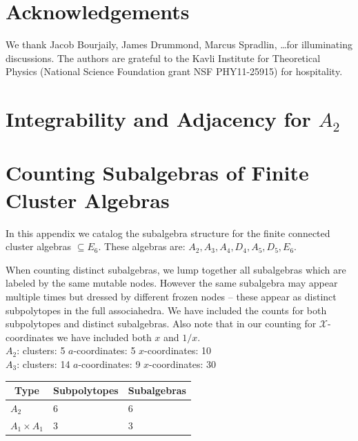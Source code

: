 \documentclass[11pt]{article}
\def\xcoords{$\mathcal{X}$-coordinates }
\def\pdfeq#1{\texorpdfstring{$#1$}{a}}
\begin{document}
\section*{Acknowledgements}

We thank Jacob Bourjaily, James Drummond, Marcus Spradlin, \dots for illuminating discussions. The authors are grateful to the Kavli Institute for Theoretical Physics (National Science Foundation grant NSF PHY11-25915) for hospitality. 


\appendix

\section{Integrability and Adjacency for \pdfeq{A_2}}  \label{appendix:integrable_A2}

\section{Counting Subalgebras of Finite Cluster Algebras}\label{appendix:subalgebras}
In this appendix we catalog the subalgebra structure for the finite connected cluster algebras \(\subseteq E_6\). These algebras are: \(A_2, A_3, A_4, D_4, A_5, D_5, E_6\).

When counting distinct subalgebras, we lump together all subalgebras which are labeled by the same mutable nodes. However the same subalgebra may appear multiple times but dressed by different frozen nodes -- these appear as distinct subpolytopes in the full associahedra. We have included the counts for both subpolytopes and distinct subalgebras. Also note that in our counting for \xcoords we have included both $x$ and $1/x$.\\ 

{\Large\underline{\(A_2\)}:} \quad clusters: 5 \qquad $a$-coordinates: 5 \qquad $x$-coordinates: 10 \\


{\Large\underline{\(A_3\)}:} \quad clusters: 14 \qquad \(a\)-coordinates: 9 \qquad \(x\)-coordinates: 30 \\

\begin{tabular}{ | l | l | l |}
\multicolumn{1}{c}{Type} &  \multicolumn{1}{c}{Subpolytopes}  &  \multicolumn{1}{c}{Subalgebras} \\
\hline \(A_2\) & 6 & 6 \\ 
\hline \(A_1 \times A_1\) & 3 & 3 \\ 
\hline
\end{tabular} \\ \\
\end{document}
